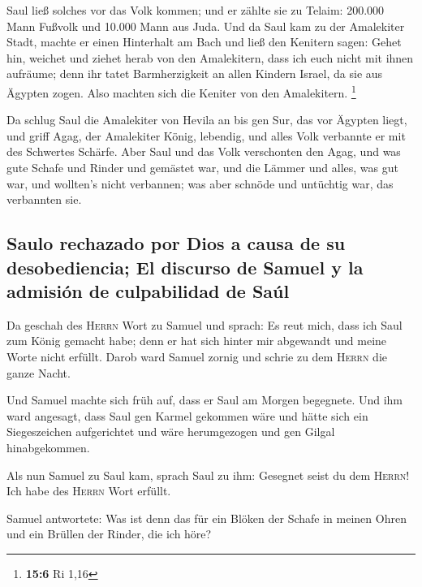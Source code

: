 Saul ließ solches vor das Volk kommen; und er zählte sie
zu Telaim: 200.000 Mann Fußvolk und 10.000 Mann aus Juda. 
Und da Saul kam zu der Amalekiter Stadt, machte er einen Hinterhalt am
Bach  und ließ den Kenitern sagen: Gehet hin, weichet und
ziehet herab von den Amalekitern, dass ich euch nicht mit ihnen
aufräume; denn ihr tatet Barmherzigkeit an allen Kindern Israel, da sie
aus Ägypten zogen. Also machten sich die Keniter von den Amalekitern.
\footnote{\textbf{15:6} Ri 1,16}

 Da schlug Saul die Amalekiter von Hevila an bis gen Sur,
das vor Ägypten liegt,  und griff Agag, der Amalekiter
König, lebendig, und alles Volk verbannte er mit des Schwertes Schärfe.
 Aber Saul und das Volk verschonten den Agag, und was gute
Schafe und Rinder und gemästet war, und die Lämmer und alles, was gut
war, und wollten's nicht verbannen; was aber schnöde und untüchtig war,
das verbannten sie.

\hypertarget{saulo-rechazado-por-dios-a-causa-de-su-desobediencia-el-discurso-de-samuel-y-la-admisiuxf3n-de-culpabilidad-de-sauxfal}{%
\subsection{Saulo rechazado por Dios a causa de su desobediencia; El
discurso de Samuel y la admisión de culpabilidad de
Saúl}\label{saulo-rechazado-por-dios-a-causa-de-su-desobediencia-el-discurso-de-samuel-y-la-admisiuxf3n-de-culpabilidad-de-sauxfal}}

 Da geschah des \textsc{Herrn} Wort zu Samuel und sprach:
 Es reut mich, dass ich Saul zum König gemacht habe; denn
er hat sich hinter mir abgewandt und meine Worte nicht erfüllt. Darob
ward Samuel zornig und schrie zu dem \textsc{Herrn} die ganze Nacht.

 Und Samuel machte sich früh auf, dass er Saul am Morgen
begegnete. Und ihm ward angesagt, dass Saul gen Karmel gekommen wäre und
hätte sich ein Siegeszeichen aufgerichtet und wäre herumgezogen und gen
Gilgal hinabgekommen.

 Als nun Samuel zu Saul kam, sprach Saul zu ihm: Gesegnet
seist du dem \textsc{Herrn}! Ich habe des \textsc{Herrn} Wort erfüllt.

 Samuel antwortete: Was ist denn das für ein Blöken der
Schafe in meinen Ohren und ein Brüllen der Rinder, die ich höre?

